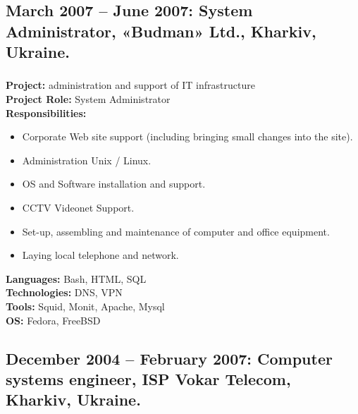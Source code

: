\documentclass[letterpaper]{article}
\begin{document}
\subsection{March 2007 – June 2007:  System Administrator, «Budman» Ltd., Kharkiv, Ukraine.}
\label{sec-2-3}
\subsubsection{}
\label{sec-2-3-1}
\textbf{Project:} administration and support of IT infrastructure\\
\textbf{Project Role:}  System Administrator\\
\textbf{Responsibilities:}
\begin{itemize}
\item Corporate Web site support (including bringing small changes into the site).
\item Administration Unix / Linux.
\item OS and Software installation and support.
\item CCTV Videonet Support.
\item Set-up, assembling and maintenance of computer and office equipment.
\item Laying local telephone and network.
\end{itemize}
\textbf{Languages:} Bash, HTML, SQL\\
\textbf{Technologies:} DNS, VPN\\
\textbf{Tools:}  Squid, Monit, Apache, Mysql\\
\textbf{OS:} Fedora, FreeBSD\\
\subsection{December 2004 – February 2007: Computer systems engineer, ISP Vokar Telecom, Kharkiv, Ukraine.}
\label{sec-2-4}
\end{document}
